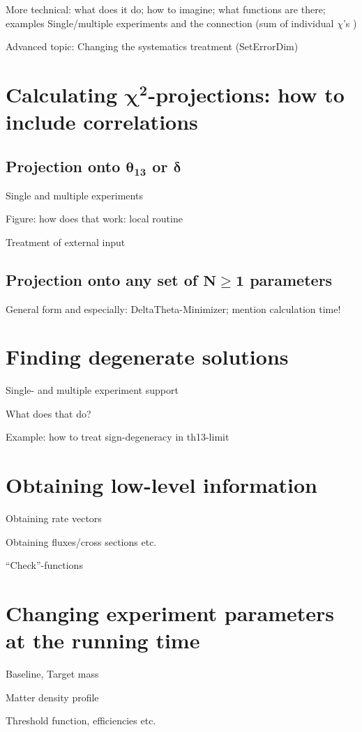 \bi
\item
 More technical: what does it do; how to imagine; what functions are there; examples
 Single/multiple experiments and the connection (sum of individual $\chi$'s )
\item
 Advanced topic: Changing the systematics treatment (SetErrorDim)
\ei

\chapter[Calculating $\chi^2$-projections: how to include correlations]{Calculating $\boldsymbol{\chi^2}$-projections: how to include correlations}

\section[Projection onto $\theta_{13}$ or $\delta$]{Projection onto $\boldsymbol{\theta_{13}}$ or $\boldsymbol{\delta}$}

\bi
\item
 Single and multiple experiments
\item
 Figure: how does that work: local routine
\item
 Treatment of external input
\ei

\section[Projection onto any set of $N \ge 1$ parameters]{Projection onto any set of $\boldsymbol{N \ge 1}$ parameters}

General form and especially: DeltaTheta-Minimizer; mention calculation time!

\chapter{Finding degenerate solutions}

\bi
\item
 Single- and multiple experiment support
\item
 What does that do?
\item
 Example: how to treat sign-degeneracy in th13-limit
\ei

\chapter{Obtaining low-level information}

\bi
\item
 Obtaining rate vectors
\item
 Obtaining fluxes/cross sections etc.
\item
 ``Check''-functions
\ei

\chapter{Changing experiment parameters at the running time}

\bi
\item
 Baseline, Target mass
\item
 Matter density profile
\item
 Threshold function, efficiencies etc.
\ei